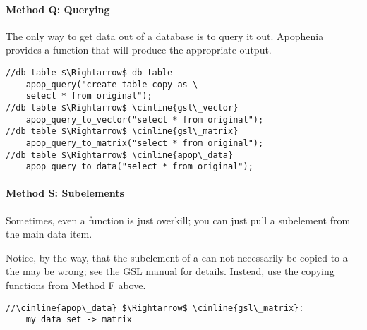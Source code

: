 \paragraph{Method Q: Querying}
 
 
The only way to get data out of a database is to query it out. Apophenia
provides a function that will produce the appropriate output.

\begin{lstlisting}
//db table $\Rightarrow$ db table
    apop_query("create table copy as \
    select * from original");
//db table $\Rightarrow$ \cinline{gsl\_vector}
    apop_query_to_vector("select * from original");
//db table $\Rightarrow$ \cinline{gsl\_matrix}
    apop_query_to_matrix("select * from original");
//db table $\Rightarrow$ \cinline{apop\_data}
    apop_query_to_data("select * from original");
\end{lstlisting}


\paragraph{Method S: Subelements} Sometimes, even a function is just
overkill; you can just pull a subelement from the main data item.

Notice, by the way, that the  subelement of a
 can not necessarily be copied to a
---the  may be wrong; see the GSL manual
for details. Instead, use the copying functions from Method F above.

\begin{lstlisting}
//\cinline{apop\_data} $\Rightarrow$ \cinline{gsl\_matrix}:
    my_data_set -> matrix
\end{lstlisting}
\lstset{texcl=false}



